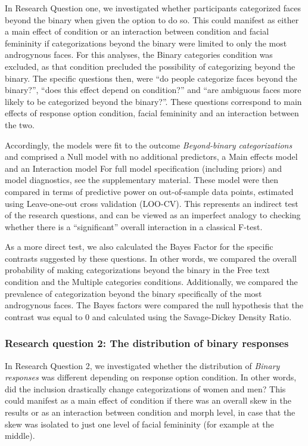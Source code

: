 \documentclass[
  man]{apa7}
\begin{document}
In Research Question one, we investigated whether participants categorized faces beyond the binary when given the option to do so. This could manifest as either a main effect of condition or an interaction between condition and facial femininity if categorizations beyond the binary were limited to only the most androgynous faces. For this analyses, the Binary categories condition was excluded, as that condition precluded the possibility of categorizing beyond the binary. The specific questions then, were ``do people categorize faces beyond the binary?'', ``does this effect depend on condition?'' and ``are ambiguous faces more likely to be categorized beyond the binary?''. These questions correspond to main effects of response option condition, facial femininity and an interaction between the two.

Accordingly, the models were fit to the outcome \emph{Beyond-binary categorizations} and comprised a Null model with no additional predictors, a Main effects model and an Interaction model For full model specification (including priors) and model diagnostics, see the supplementary material. These model were then compared in terms of predictive power on out-of-sample data points, estimated using Leave-one-out cross validation (LOO-CV). This represents an indirect test of the research questions, and can be viewed as an imperfect analogy to checking whether there is a ``significant'' overall interaction in a classical F-test.

As a more direct test, we also calculated the Bayes Factor for the specific contrasts suggested by these questions. In other words, we compared the overall probability of making categorizations beyond the binary in the Free text condition and the Multiple categories conditions. Additionally,
we compared the prevalence of categorization beyond the binary specifically of the most androgynous faces. The Bayes factors were compared the null hypothesis that the contrast was equal to 0 and calculated using the Savage-Dickey Density Ratio.

\hypertarget{research-question-2-the-distribution-of-binary-responses}{%
\subsubsection{Research question 2: The distribution of binary responses}\label{research-question-2-the-distribution-of-binary-responses}}

In Research Question 2, we investigated whether the distribution of \emph{Binary responses} was different depending on response option condition. In other words, did the inclusion drastically change categorizations of women and men? This could manifest as a main effect of condition if there was an overall skew in the results or as an interaction between condition and morph level, in case that the skew was isolated to just one level of facial femininity (for example at the middle).
\end{document}
